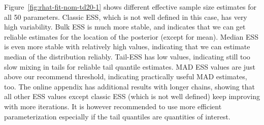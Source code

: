 \documentclass[american,]{article}
\theoremstyle{definition}
\begin{document}
Figure~\ref{fig:rhat-fit-nom-td20-1} shows different effective sample
size estimates for all 50 parameters. Classic ESS, which is not well
defined in this case, has very high variability. Bulk ESS is much more
stable, and indicates that we can get reliable estimates for the
location of the posterior (except for mean). Median ESS is even more
stable with relatively high values, indicating that we can estimate
median of the distribution reliably. Tail-ESS has low values,
indicating still too slow mixing in tails for reliable tail quantile
estimates. MAD ESS values are just above our recommend threshold,
indicating practically useful MAD estimates, too. The online appendix
has additional results with longer chains, showing that all other ESS
values except classic ESS (which is not well defined) keep improving
with more iterations. It is however recommended to use more efficient
parameterization especially if the tail quantiles are quantities of
interest.







\end{document}
